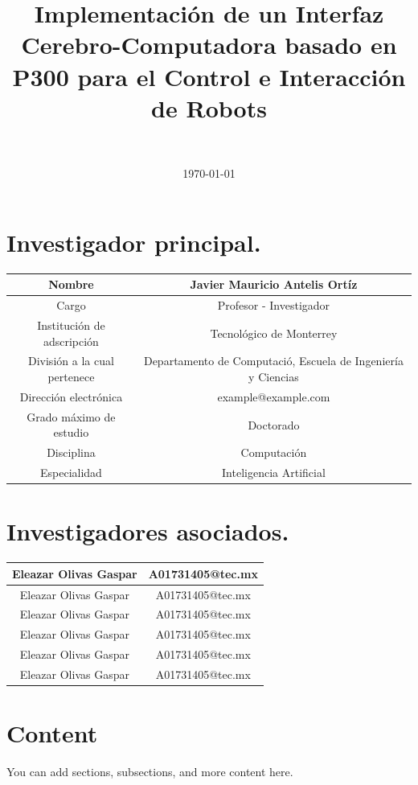 \documentclass{article}
\title{Implementación de un Interfaz Cerebro-Computadora basado en P300 para el Control e Interacción de Robots}
\author{~}  %
\date{\today}
\begin{document}
\maketitle

\section{Investigador principal.}
\begin{table}[h!]
    \centering
    \begin{tabular}{|c|c|} \hline
        Nombre & Javier Mauricio Antelis Ortíz \\ \hline
        Cargo & Profesor - Investigador \\ \hline
        Institución de adscripción & Tecnológico de Monterrey \\ \hline
        División a la cual pertenece & Departamento de Computació, Escuela de Ingeniería y Ciencias \\ \hline
        Dirección electrónica & example@example.com \\ \hline
        Grado máximo de estudio & Doctorado \\ \hline
        Disciplina & Computación \\ \hline
        Especialidad & Inteligencia Artificial \\ \hline
    \end{tabular}
\end{table}

\section{Investigadores asociados.}

\begin{table}[h!]
    \centering
    \begin{tabular}{|c|c|} \hline
        Eleazar Olivas Gaspar & A01731405@tec.mx \\ \hline
        Eleazar Olivas Gaspar & A01731405@tec.mx \\ \hline
        Eleazar Olivas Gaspar & A01731405@tec.mx \\ \hline
        Eleazar Olivas Gaspar & A01731405@tec.mx \\ \hline
        Eleazar Olivas Gaspar & A01731405@tec.mx \\ \hline
        Eleazar Olivas Gaspar & A01731405@tec.mx \\ \hline        
    \end{tabular}
\end{table}

\section{Content}
You can add sections, subsections, and more content here.
\end{document}
